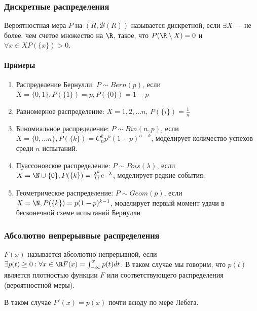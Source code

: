 \subsubsection{Дискретные распределения}

\begin{definition}
    Вероятностная мера \(P\) на \((R, \mathcal{B}(R))\) называется дискретной, если \(\exists X\) --- не более. чем счетое множество на \(\R\), такое, что \(P(\R \setminus X) = 0\) и \(\forall x \in X P(\{x\}) > 0\).
\end{definition}

\paragraph{Примеры}
\begin{enumerate}
    \item Распределение Бернулли: \(P \sim Bern(p)\), если \(X = \{0, 1\}, P(\{1\}) = p, P(\{0\}) = 1 - p\)
    \item Равномерное распределение: \(X = {1, 2, \dots n}\), \(P(\{i\}) = \frac{1}{n}\)
    \item Биномиальное распределение: \(P \sim Bin(n, p)\), если \(X = \{0, \dots n\}, P(\{k\}) = C_n^kp^k(1 - p)^{n - k}\), моделирует количество успехов среди \(n\) испытаний.
    \item Пуассоновское распределение: \(P \sim Pois(\lambda)\), если \(X = \N \cup \{0\}, P(\{k\}) = \frac{\lambda^k}{k!}e^{-\lambda}\), моделирует редкие события,
    \item Геометрическое распределение: \(P \sim Geom(p)\), если \(X = \N, P(\{k\}) = p(1 - p)^{k-1}\), моделирует первый момент удачи в бесконечной схеме испытаний Бернулли
\end{enumerate}

\subsubsection{Абсолютно непрерывные распределения}

\begin{definition}
    \(F(x)\) называется абсолютно непрерывной, если \(\exists p(t) \ge 0: \forall x \in \R F(x) = \int_{-\infty}^x p(t)dt\). В таком случае мы говорим, что \(p(t)\) является плотностью функции \(F\) или соответствующего распределения (вероятностной меры).
\end{definition}

\begin{note}
    В таком случае \(F'(x) = p(x)\) почти всюду по мере Лебега.
\end{note}

